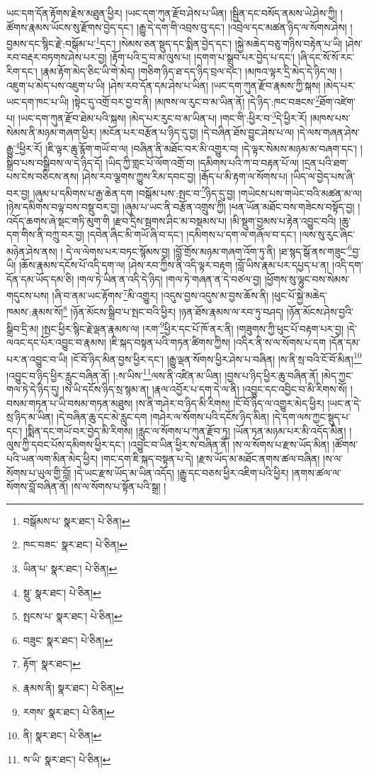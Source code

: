 ཡང་དག་དོན་རྟོགས་རྗེས་མཐུན་ཕྱིར། །ཡང་དག་ཀུན་རྫོབ་ཤེས་པ་ཡིན། །སྦྱིན་དང་བསོད་ནམས་ཡེ་ཤེས་ཀྱི། །ཚོགས་རྣམས་ཡོངས་སུ་རྫོགས་བྱེད་དང་། །རྒྱུ་དེ་དག་གི་འབྲས་བུ་དང་། །འབྲེལ་དང་མཚན་ཉིད་ལ་སོགས་ཤེས། །བྱམས་དང་སྙིང་རྗེ་:བསྒོམ་པ་\footnote{བསྒོམས་པ་  སྣར་ཐང་།  པེ་ཅིན། }དང་། །སེམས་ཅན་སྡུད་དང་སྨིན་བྱེད་དང་། །སྐྱེ་མཆེད་བཅུ་གཉིས་བརྟེན་པ་ཡི། །ཤེས་རབ་བརྡར་བཏགས་ཤེས་པར་བྱ། །རྟོག་པའི་དྲ་བ་མ་ལུས་པ། །དགག་པ་སྒྲུབ་པར་བྱེད་པ་དང་། །ཞི་དང་སོ་སོ་རང་རིག་དང་། །རྣམ་རྟོག་མེད་ཅིང་ཡི་གེ་མེད། །གཅིག་ཉིད་ཐ་དད་ཉིད་བྲལ་དང་། །མཁའ་ལྟར་དྲི་མེད་དེ་ཉིད་ལ། །འཇུག་པ་མེད་པས་འཇུག་པ་ཡི། །ཤེས་རབ་དོན་དམ་ཤེས་པ་ཡིན། །ཡང་དག་ཀུན་རྫོབ་རྣམས་ཀྱི་སྐས། །མེད་པར་ཡང་དག་ཁང་པ་ཡི། །སྟེང་དུ་འགྲོ་བར་བྱ་བ་ནི། །མཁས་ལ་རུང་བ་མ་ཡིན་ནོ། །དེ་ཉིད་:ཁང་བཟངས་\footnote{ཁང་བཟང་  སྣར་ཐང་།  པེ་ཅིན། }ཐོག་འཛེག་པ། །ཡང་དག་ཀུན་རྫོབ་ཐེམ་པའི་སྐས། །མེད་པར་རུང་བ་མ་ཡིན་པ། །གང་གི་:ཕྱིར་བ་\footnote{ཡིན་པ་  སྣར་ཐང་།  པེ་ཅིན། }དེ་ཕྱིར་རོ། །མཁས་པས་སེམས་ནི་མཉམ་གཞག་ཕྱིར། །མངོན་པར་བརྩོན་པ་ཉིད་དུ་བྱ། །དེ་བཞིན་ཐོས་བྱུང་ཤེས་པ་ལ། །དེ་ལས་གཞན་ཤེས་རྒྱུ་\footnote{སྡུ་  སྣར་ཐང་།  པེ་ཅིན། }ཕྱིར་རོ། །ཇི་ལྟར་ཆུ་རྙོག་གཡོ་བ་ལ། །བཞིན་ནི་མཐོང་བར་མི་འགྱུར་བ། །དེ་ལྟར་སེམས་མཉམ་མ་བཞག་དང་། །སྒྲིབ་པས་བསྒྲིབས་ལ་དེ་ཉིད་དོ། །ཡིད་ཀྱི་གླང་པོ་ལོག་འགྲོ་བ། །དམིགས་པའི་ཀ་བ་བརྟན་པོ་ལ། །དྲན་པའི་ཐག་པས་ངེས་བཅིངས་ནས། །ཤེས་རབ་ལྕགས་ཀྱུས་རིམ་དབང་བྱ། །རྒོད་པ་མི་རྟག་ལ་སོགས་པ། །ཡིད་ལ་བྱེད་པས་ཞི་བར་བྱ། །ཞུམ་པ་དམིགས་པ་རྒྱ་ཆེན་དག །བསྒོམ་པས་:སྤང་བ་\footnote{སྤངས་པ་  སྣར་ཐང་།  པེ་ཅིན། }ཉིད་དུ་བྱ། །གཡེངས་པས་གཡེང་བའི་མཚན་མ་ལ། །ཉེས་དམིགས་བལྟ་བས་བསྡུ་བར་བྱ། །ཞུམ་པ་ཡང་ནི་བརྩོན་འགྲུས་ཀྱི། །ཕན་ཡོན་མཐོང་བས་གཟེངས་བསྟོད་བྱ། །འདོད་ཆགས་ཞེ་སྡང་གཏི་མུག་གི །རྫབ་དྲིས་སྦགས་ཤིང་མ་བསྡམས་པ། །མི་སྡུག་བྱམས་པ་རྟེན་འབྱུང་བའི། །ཆུ་དག་གིས་ནི་བཀྲུ་བར་བྱ། །དབེན་ཞིང་མི་གཡོ་ཞི་བ་དང་། །དམིགས་པ་དག་ལ་གཞོལ་བ་དང་། །ལས་སུ་རུང་ཞིང་མཉེན་ཤེས་ནས། །
དེ་ལ་ལེགས་པར་བཏང་སྙོམས་བྱ། །བློ་གྲོས་མཉམ་གཞག་འོག་ཏུ་ནི། །ཐ་སྙད་སྒོ་ནས་གཟུང་\footnote{བཟུང་  སྣར་ཐང་།  པེ་ཅིན། }བྱ་ཡི། །ཆོས་རྣམས་དངོས་པོ་འདི་དག་ལ། །ཤེས་རབ་ཀྱིས་ནི་འདི་ལྟར་བརྟག །བློ་ཡིས་རྣམ་པར་དཔྱད་པ་ན། །འདི་དག་དོན་དམ་ཡོད་དམ་ཅི། །གལ་ཏེ་ཡིན་ན་འདི་དེ་ཉིད། །གལ་ཏེ་གཞན་ན་དེ་བཙལ་བྱ། །ཕྱོགས་སུ་ལྷུང་བས་སེམས་གདུངས་པས། །ཞི་བ་ནམ་ཡང་རྟོགས་\footnote{རྟོག་  སྣར་ཐང་། }མི་འགྱུར། །འདུས་བྱས་འདུས་མ་བྱས་ཆོས་ནི། །ཕུང་པོ་སྐྱེ་མཆེད་ཁམས་:རྣམས་སོ།\footnote{རྣམས་ནི།  སྣར་ཐང་།  པེ་ཅིན། } །ཉོན་མོངས་སྒྲིབ་པ་སྤང་བའི་ཕྱིར། །ཉན་ཐོས་རྣམས་ལ་རབ་ཏུ་བཤད། །ཉོན་མོངས་ཤེས་བྱའི་སྒྲིབ་དྲི་མ། །སྤང་ཕྱིར་སྙིང་རྗེ་ལྡན་རྣམས་ལ། །རག་\footnote{རགས་  སྣར་ཐང་།  པེ་ཅིན། }ཕྱིར་དང་པོ་ཁོ་ནར་ནི། །གཟུགས་ཀྱི་ཕུང་པོ་བརྟག་པར་བྱ། །དེ་ལའང་དང་པོར་འབྱུང་བ་རྣམས། །ཇི་སྐད་བསྟན་པའི་གཏན་ཚིགས་ཀྱིས། །འདིར་ནི་ས་ལ་སོགས་པ་དག །དོན་དམ་པར་ན་འབྱུང་བ་ཡི། །ངོ་བོ་ཉིད་མིན་བྱས་ཕྱིར་དང་། །རྒྱུ་ལྡན་སོགས་ཕྱིར་ཤེས་པ་བཞིན། །ས་ནི་སྲ་བའི་ངོ་བོ་མིན།\footnote{ནི།  སྣར་ཐང་།  པེ་ཅིན། } །འབྱུང་བ་ཉིད་ཕྱིར་རླུང་བཞིན་ནོ། །:ས་ཡིས་\footnote{ས་ཡི་  སྣར་ཐང་།  པེ་ཅིན། }ལས་ནི་འཛིན་མ་ཡིན། །བྱས་པ་ཉིད་ཕྱིར་ཆུ་བཞིན་ནོ། །མེད་ཀྱང་གལ་ཏེ་དེ་ཉིད་དུ། །ས་ཡི་དངོས་ཉིད་སྲ་སྙམ་ན། །རྣལ་འབྱོར་པ་དག་དེ་ལ་ནི། །འབྱུང་དང་འབྱིང་བ་མི་རིགས་སོ། །བསམ་གཏན་པ་ཡི་བསམ་གཏན་མཐུས། །ས་ནི་གཤེར་བ་ཉིད་མི་རིགས། །ངོ་བོ་ཉིད་ལ་འགྱུར་མེད་ཕྱིར། །ཡང་ན་དེ་སྲ་ཉིད་མ་ཡིན། །དེ་བཞིན་ཆུ་དང་མེ་རླུང་དག །གཤེར་ལ་སོགས་པའི་དངོས་ཉིད་མིན། །དེ་དག་ལས་ཀྱང་སྡུད་པ་དང་། །སྨིན་དང་གཡོ་བར་བྱེད་མི་རིགས། །རླུང་ལ་སོགས་པ་ཀུན་རྫོབ་ཏུ། །ཡོན་ཏན་མཉམ་པར་མི་འདོད་མིན། །ལུས་ཀྱི་དབང་པོས་དམིགས་ཕྱིར་དང་། །འབྱུང་བ་ཡིན་ཕྱིར་ས་བཞིན་ནོ། །ས་ལ་སོགས་པ་རྫས་ཡོད་མིན། །ཚོགས་པའི་ཡན་ལག་མིན་མེད་ཕྱིར། །གང་དག་ཇི་སྐད་བསྟན་པ་དེ། །རྫས་ཡོད་མ་མཐོང་ནགས་ཚལ་བཞིན། །ས་ལ་སོགས་པ་ཡུལ་གྱི་བློ། །དེ་ཡང་རྫས་ཡོད་མ་ཡིན་འདོད། །རྒྱུ་དང་བཅས་ཕྱིར་འཇིག་པའི་ཕྱིར། །ནགས་ཚལ་ལ་སོགས་བློ་བཞིན་ནོ། །ས་ལ་སོགས་པ་སྟོན་པའི་སྒྲ། །
